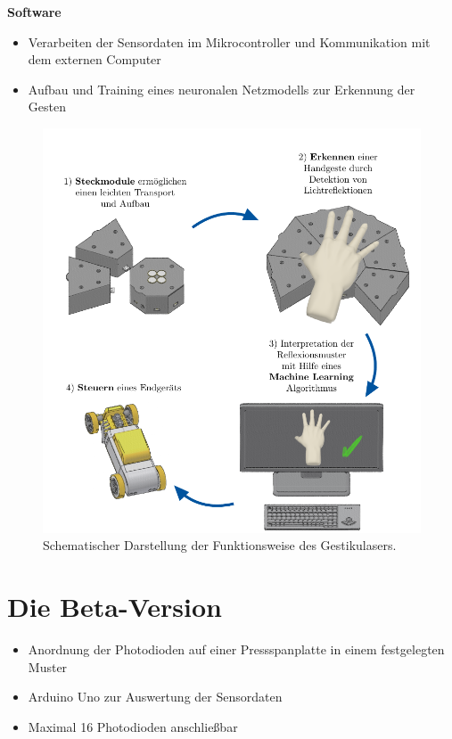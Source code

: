 \documentclass{sciposter}
\begin{document}
\begin{multicols}{3}
\noindent
\textbf{Software}
\begin{itemize}
	\item Verarbeiten der Sensordaten im Mikrocontroller und Kommunikation mit dem externen Computer
	\item Aufbau und Training eines neuronalen Netzmodells zur Erkennung der Gesten
\end{itemize}

\begin{figure}[h]
	\centering
	\includegraphics[scale=1.25]{../figures/tikz/GestikulaserAblauf.pdf}
	\caption{Schematischer Darstellung der Funktionsweise des Gestikulasers.}
	\label{fig:FunktionsweiseGestikulaser}
\end{figure}


\section{Die Beta-Version}

\begin{itemize}
	\item Anordnung der Photodioden auf einer Pressspanplatte in einem festgelegten Muster
	\item Arduino Uno zur Auswertung der Sensordaten
	\item Maximal 16 Photodioden anschließbar
\end{itemize}


\end{multicols}
\end{document}
